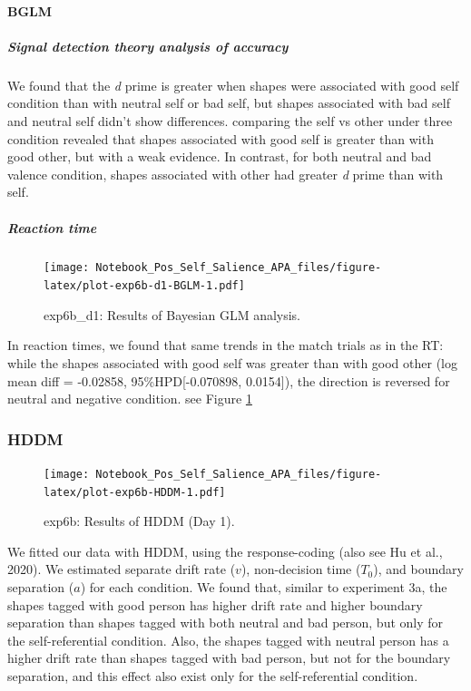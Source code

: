 \documentclass[
  english,
  man]{apa6}
\let\oldparagraph\paragraph
\renewcommand{\paragraph}[1]{\oldparagraph{#1}\mbox{}}
\let\oldsubparagraph\subparagraph
\renewcommand{\subparagraph}[1]{\oldsubparagraph{#1}\mbox{}}
\begin{document}
\hypertarget{bglm-4}{%
\paragraph{BGLM}\label{bglm-4}}

\hypertarget{signal-detection-theory-analysis-of-accuracy-6}{%
\subparagraph{Signal detection theory analysis of accuracy}\label{signal-detection-theory-analysis-of-accuracy-6}}

We found that the \emph{d} prime is greater when shapes were associated with good self condition than with neutral self or bad self, but shapes associated with bad self and neutral self didn't show differences. comparing the self vs other under three condition revealed that shapes associated with good self is greater than with good other, but with a weak evidence. In contrast, for both neutral and bad valence condition, shapes associated with other had greater \emph{d} prime than with self.

\hypertarget{reaction-time-9}{%
\subparagraph{Reaction time}\label{reaction-time-9}}

\begin{figure}
\centering
\texttt{[image: Notebook\_Pos\_Self\_Salience\_APA\_files/figure-latex/plot-exp6b-d1-BGLM-1.pdf]}
\caption{\label{fig:plot-exp6b-d1-BGLM}exp6b\_d1: Results of Bayesian GLM analysis.}
\end{figure}

In reaction times, we found that same trends in the match trials as in the RT: while the shapes associated with good self was greater than with good other (log mean diff = -0.02858, 95\%HPD{[}-0.070898, 0.0154{]}), the direction is reversed for neutral and negative condition. see Figure \ref{fig:plot-exp6b-d1-BGLM}

\hypertarget{hddm-6}{%
\subsubsection{HDDM}\label{hddm-6}}

\begin{figure}
\centering
\texttt{[image: Notebook\_Pos\_Self\_Salience\_APA\_files/figure-latex/plot-exp6b-HDDM-1.pdf]}
\caption{\label{fig:plot-exp6b-HDDM}exp6b: Results of HDDM (Day 1).}
\end{figure}

We fitted our data with HDDM, using the response-coding (also see Hu et al., 2020). We estimated separate drift rate (\(v\)), non-decision time (\(T_{0}\)), and boundary separation (\(a\)) for each condition. We found that, similar to experiment 3a, the shapes tagged with good person has higher drift rate and higher boundary separation than shapes tagged with both neutral and bad person, but only for the self-referential condition. Also, the shapes tagged with neutral person has a higher drift rate than shapes tagged with bad person, but not for the boundary separation, and this effect also exist only for the self-referential condition.
\end{document}
